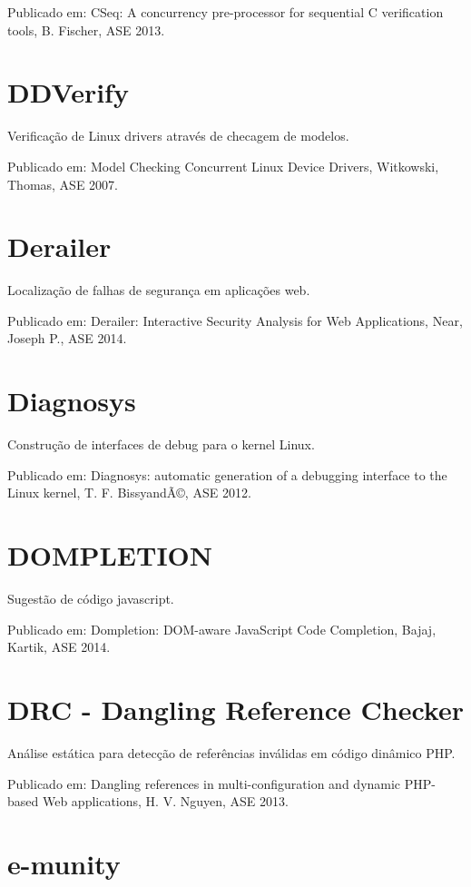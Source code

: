 Publicado em: CSeq: A concurrency pre-processor for sequential C verification tools,
B. Fischer,
ASE
2013.

\section{DDVerify}

Verificação de Linux drivers através de checagem de modelos.

Publicado em: Model Checking Concurrent Linux Device Drivers,
Witkowski, Thomas,
ASE
2007.

\section{Derailer}

Localização de falhas de segurança em aplicações web.

Publicado em: Derailer: Interactive Security Analysis for Web Applications,
Near, Joseph P.,
ASE
2014.

\section{Diagnosys}

Construção de interfaces de debug para o kernel Linux.

Publicado em: Diagnosys: automatic generation of a debugging interface to the Linux kernel,
T. F. BissyandÃ©,
ASE
2012.

\section{DOMPLETION}

Sugestão de código javascript.

Publicado em: Dompletion: DOM-aware JavaScript Code Completion,
Bajaj, Kartik,
ASE
2014.

\section{DRC - Dangling Reference Checker}

Análise estática para detecção de referências inválidas em código dinâmico PHP.

Publicado em: Dangling references in multi-configuration and dynamic PHP-based Web applications,
H. V. Nguyen,
ASE
2013.

\section{e-munity}

